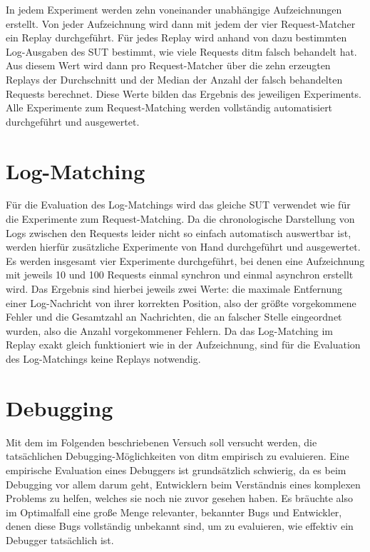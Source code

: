 \documentclass[12pt,a4paper]{report}
\begin{document}
In jedem Experiment werden zehn voneinander unabhängige Aufzeichnungen erstellt. Von jeder Aufzeichnung wird dann mit jedem der vier
Request-Matcher ein Replay durchgeführt. Für jedes Replay wird anhand von dazu bestimmten Log-Ausgaben des SUT bestimmt, wie viele
Requests ditm falsch behandelt hat. Aus diesem Wert wird dann pro Request-Matcher über die zehn erzeugten Replays der Durchschnitt
und der Median der Anzahl der falsch behandelten Requests berechnet. Diese Werte bilden das Ergebnis des jeweiligen Experiments.
Alle Experimente zum Request-Matching werden vollständig automatisiert durchgeführt und ausgewertet.

\section{Log-Matching}
\label{chap:exp_logs}
Für die Evaluation des Log-Matchings wird das gleiche SUT verwendet wie für die Experimente zum Request-Matching.
Da die chronologische Darstellung von Logs zwischen den Requests leider nicht so einfach automatisch auswertbar ist, werden
hierfür zusätzliche Experimente von Hand durchgeführt und ausgewertet. Es werden insgesamt vier Experimente durchgeführt, bei
denen eine Aufzeichnung mit jeweils 10 und 100 Requests einmal synchron und einmal asynchron erstellt wird. Das Ergebnis sind
hierbei jeweils zwei Werte: die maximale Entfernung einer Log-Nachricht von ihrer korrekten Position, also der größte vorgekommene
Fehler und die Gesamtzahl an Nachrichten, die an falscher Stelle eingeordnet wurden, also die Anzahl vorgekommener Fehlern. Da das
Log-Matching im Replay exakt gleich funktioniert wie in der Aufzeichnung, sind für die Evaluation des Log-Matchings keine Replays
notwendig.

\section{Debugging}
\label{chap:debugging_exp}
Mit dem im Folgenden beschriebenen Versuch soll versucht werden, die tat\-säch\-lichen Debugging-Möglichkeiten von ditm empirisch zu
evaluieren. Eine empirische Evaluation eines Debuggers ist grundsätzlich schwierig, da es beim Debugging vor allem darum geht,
Entwicklern beim Verständnis eines komplexen Problems zu helfen, welches sie noch nie zuvor gesehen haben. Es bräuchte also im
Optimalfall eine große Menge relevanter, bekannter Bugs und Entwickler, denen diese Bugs vollständig unbekannt sind, um zu
evaluieren, wie effektiv ein Debugger tatsächlich ist.
\end{document}
